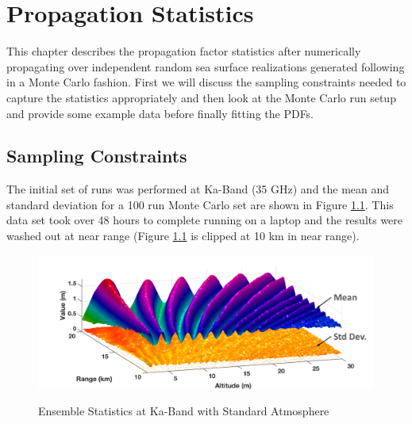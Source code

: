 \renewcommand{\baselinestretch}{2} \small\normalsize
\chapter{Propagation Statistics}
This chapter describes the propagation factor statistics after numerically propagating over independent random sea surface realizations generated following \cite{frazier_ocean} in a Monte Carlo fashion. First we will discuss the sampling constraints needed to capture the statistics appropriately and then look at the Monte Carlo run setup and provide some example data before finally fitting the PDFs.

\section{Sampling Constraints}
The initial set of runs was performed at Ka-Band (35 GHz) and the mean and standard deviation for a 100 run Monte Carlo set are shown in Figure \ref{stat_fig:1}. This data set took over 48 hours to complete running on a laptop and the results were washed out at near range (Figure \ref{stat_fig:1} is clipped at 10 km in near range).

\begin{figure}[H]
  \begin{center}
\includegraphics[width=5in]{../media/statistics/ka_band_stats.png}
  \end{center}
  \renewcommand{\baselinestretch}{1} \small\normalsize
  \begin{quote}
    \caption[Ensemble Statistics at Ka-Band with Standard Atmosphere]{Ensemble Statistics at Ka-Band with Standard Atmosphere\label{stat_fig:1}}
  \end{quote}
\end{figure}
\renewcommand{\baselinestretch}{2} \small\normalsize


